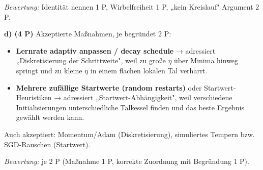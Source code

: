 \documentclass[11pt, a4paper]{article}
\begin{document}
\textit{Bewertung:} Identität nennen 1 P, Wirbelfreiheit 1 P, „kein Kreislauf" Argument 2 P.


\textbf{d) (4 P)} Akzeptierte Maßnahmen, je begründet 2 P:

\begin{itemize}
  \item \textbf{Lernrate adaptiv anpassen / decay schedule} → adressiert „Diskretisierung der Schrittweite", weil zu große $\eta$ über Minima hinweg springt und zu kleine $\eta$ in einem flachen lokalen Tal verharrt.
  \item \textbf{Mehrere zufällige Startwerte (random restarts)} oder Startwert-Heuristiken → adressiert „Startwert-Abhängigkeit", weil verschiedene Initialisierungen unterschiedliche Talkessel finden und das beste Ergebnis gewählt werden kann.
\end{itemize}
Auch akzeptiert: Momentum/Adam (Diskretisierung), simuliertes Tempern bzw. SGD-Rauschen (Startwert).

\textit{Bewertung:} je 2 P (Maßnahme 1 P, korrekte Zuordnung mit Begründung 1 P).





\end{document}
